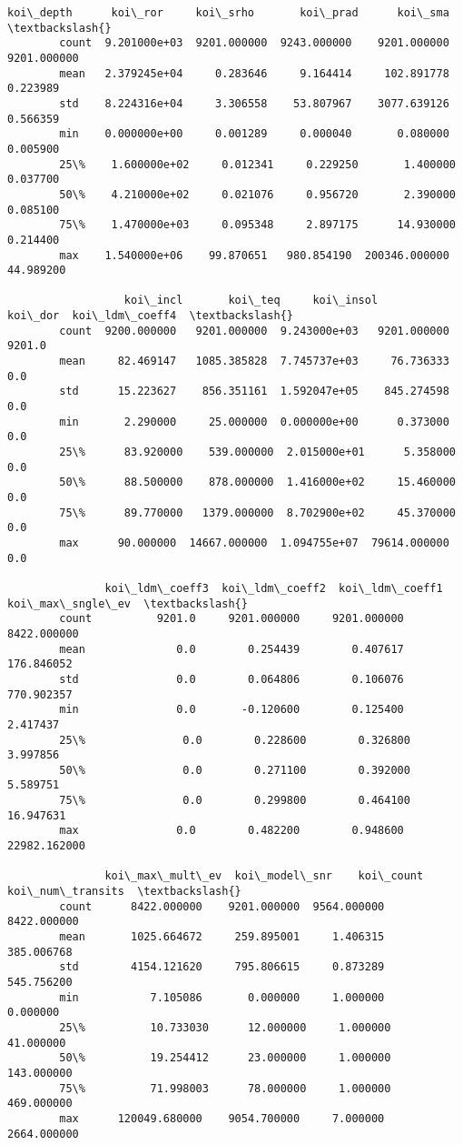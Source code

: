 \documentclass[11pt]{article}
\begin{document}
\begin{Verbatim}[commandchars=\\\{\}]
                  koi\_depth      koi\_ror     koi\_srho       koi\_prad      koi\_sma  \textbackslash{}
        count  9.201000e+03  9201.000000  9243.000000    9201.000000  9201.000000   
        mean   2.379245e+04     0.283646     9.164414     102.891778     0.223989   
        std    8.224316e+04     3.306558    53.807967    3077.639126     0.566359   
        min    0.000000e+00     0.001289     0.000040       0.080000     0.005900   
        25\%    1.600000e+02     0.012341     0.229250       1.400000     0.037700   
        50\%    4.210000e+02     0.021076     0.956720       2.390000     0.085100   
        75\%    1.470000e+03     0.095348     2.897175      14.930000     0.214400   
        max    1.540000e+06    99.870651   980.854190  200346.000000    44.989200   
        
                  koi\_incl       koi\_teq     koi\_insol       koi\_dor  koi\_ldm\_coeff4  \textbackslash{}
        count  9200.000000   9201.000000  9.243000e+03   9201.000000          9201.0   
        mean     82.469147   1085.385828  7.745737e+03     76.736333             0.0   
        std      15.223627    856.351161  1.592047e+05    845.274598             0.0   
        min       2.290000     25.000000  0.000000e+00      0.373000             0.0   
        25\%      83.920000    539.000000  2.015000e+01      5.358000             0.0   
        50\%      88.500000    878.000000  1.416000e+02     15.460000             0.0   
        75\%      89.770000   1379.000000  8.702900e+02     45.370000             0.0   
        max      90.000000  14667.000000  1.094755e+07  79614.000000             0.0   
        
               koi\_ldm\_coeff3  koi\_ldm\_coeff2  koi\_ldm\_coeff1  koi\_max\_sngle\_ev  \textbackslash{}
        count          9201.0     9201.000000     9201.000000       8422.000000   
        mean              0.0        0.254439        0.407617        176.846052   
        std               0.0        0.064806        0.106076        770.902357   
        min               0.0       -0.120600        0.125400          2.417437   
        25\%               0.0        0.228600        0.326800          3.997856   
        50\%               0.0        0.271100        0.392000          5.589751   
        75\%               0.0        0.299800        0.464100         16.947631   
        max               0.0        0.482200        0.948600      22982.162000   
        
               koi\_max\_mult\_ev  koi\_model\_snr    koi\_count  koi\_num\_transits  \textbackslash{}
        count      8422.000000    9201.000000  9564.000000       8422.000000   
        mean       1025.664672     259.895001     1.406315        385.006768   
        std        4154.121620     795.806615     0.873289        545.756200   
        min           7.105086       0.000000     1.000000          0.000000   
        25\%          10.733030      12.000000     1.000000         41.000000   
        50\%          19.254412      23.000000     1.000000        143.000000   
        75\%          71.998003      78.000000     1.000000        469.000000   
        max      120049.680000    9054.700000     7.000000       2664.000000   
        

\end{Verbatim}
\end{document}
